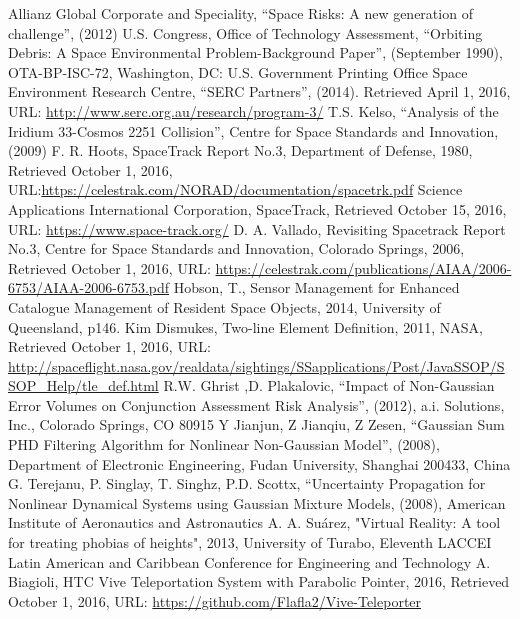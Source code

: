 \documentclass[12pt,openany,a4paper]{book}
\begin{document}
	\begin{thebibliography}{99}
		Allianz Global Corporate and Speciality, “Space Risks: A new generation of challenge”, (2012)
		 U.S. Congress, Office of Technology Assessment, “Orbiting Debris: A Space Environmental Problem-Background Paper”, (September 1990), OTA-BP-ISC-72, Washington, DC: U.S. Government Printing Office
		Space Environment Research Centre, “SERC Partners”, (2014). Retrieved April 1, 2016, URL: \url{http://www.serc.org.au/research/program-3/}
		T.S. Kelso, “Analysis of the Iridium 33-Cosmos 2251 Collision”, Centre for Space Standards and Innovation, (2009)
		F. R. Hoots, SpaceTrack Report No.3, Department of Defense, 1980,
		 Retrieved October 1, 2016, URL:\url{https://celestrak.com/NORAD/documentation/spacetrk.pdf}
 		Science Applications International Corporation, SpaceTrack, Retrieved October 15, 2016, URL:	\url{https://www.space-track.org/}
		D. A. Vallado, Revisiting Spacetrack Report No.3, Centre for Space Standards and Innovation, Colorado Springs, 2006, Retrieved October 1, 2016, URL: \url{https://celestrak.com/publications/AIAA/2006-6753/AIAA-2006-6753.pdf}
		Hobson, T.,  Sensor Management for Enhanced Catalogue Management of Resident Space Objects, 2014, University of Queensland, p146.
		 Kim Dismukes, Two-line Element Definition, 2011, NASA, Retrieved October 1, 2016, URL: \url{http://spaceflight.nasa.gov/realdata/sightings/SSapplications/Post/JavaSSOP/SSOP_Help/tle_def.html}
		R.W. Ghrist ,D. Plakalovic, “Impact of Non-Gaussian Error Volumes on Conjunction Assessment Risk Analysis”, (2012), a.i. Solutions, Inc., Colorado Springs, CO 80915
		Y Jianjun, Z Jianqiu, Z Zesen, “Gaussian Sum PHD Filtering Algorithm for Nonlinear Non-Gaussian Model”, (2008), Department of Electronic Engineering, Fudan University, Shanghai 200433, China
		G. Terejanu, P. Singlay, T. Singhz, P.D. Scottx, “Uncertainty Propagation for Nonlinear Dynamical Systems using Gaussian Mixture Models, (2008), American Institute of Aeronautics and Astronautics
		A. A. Suárez, "Virtual Reality: A tool for treating phobias of heights", 2013, University of Turabo, Eleventh LACCEI Latin American and Caribbean Conference for Engineering and Technology
		A. Biagioli, HTC Vive Teleportation System with Parabolic Pointer, 2016, Retrieved October 1, 2016, URL: \url{https://github.com/Flafla2/Vive-Teleporter}

\end{thebibliography}
\end{document}
